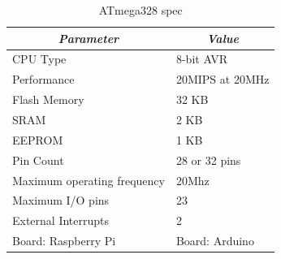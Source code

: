     \begin{table}
        \centering
        \begin{tabular}{|l|l|}
            \hline
            \multicolumn{1}{|c|}{\textit{\textbf{Parameter}}} & \multicolumn{1}{c|}{\textit{\textbf{Value}}} \\ \hline
            CPU Type                    & 8-bit AVR       \\ \hline
            Performance                 & 20MIPS at 20MHz \\ \hline
            Flash Memory                & 32 KB           \\ \hline
            SRAM                        & 2 KB            \\ \hline
            EEPROM                      & 1 KB            \\ \hline
            Pin Count                   & 28 or 32 pins   \\ \hline
            Maximum operating frequency & 20Mhz           \\ \hline
            Maximum I/O pins            & 23              \\ \hline
            External Interrupts         & 2               \\ \hline
            Board: Raspberry Pi         & Board: Arduino  \\ \hline
        \end{tabular}
        \caption{ATmega328 spec}
    \end{table}

